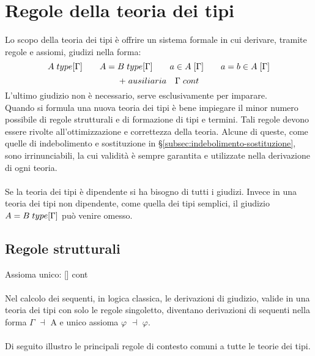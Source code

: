 \chapter{Regole della teoria dei tipi}
\label{cap:regole-teoria-dei-tipi}
Lo scopo della teoria dei tipi \`e offrire un sistema formale in cui derivare, tramite regole e assiomi, giudizi nella forma:
\[ A \hspace{0.1cm} type[\Gamma] \qquad
A = B \hspace{0.1cm} type[\Gamma] \qquad
a \in A\hspace{0.1cm} [\Gamma] \qquad
a=b \in A \hspace{0.1cm}[\Gamma]
\]
\[
+ \hspace{0.1cm} ausiliaria \quad \Gamma \hspace{0.1cm} cont
\]
L'ultimo giudizio non \`e necessario, serve esclusivamente per imparare.\\
Quando si formula una nuova teoria dei tipi \`e bene impiegare il minor numero possibile di regole strutturali e di formazione di tipi e termini. Tali regole devono essere rivolte all'ottimizzazione e correttezza della teoria. Alcune di queste, come quelle di indebolimento e sostituzione in \S\ref{subsec:indebolimento-sostituzione}, sono irrinunciabili, la cui validit\`a \`e sempre garantita e utilizzate nella derivazione di ogni teoria.\\\\
Se la teoria dei tipi \`e dipendente si ha bisogno di tutti i giudizi. Invece in una teoria dei tipi non dipendente, come quella dei tipi semplici, il giudizio $A = B \hspace{0.1cm} type[\Gamma]$ pu\`o venire omesso.\\

\section{Regole strutturali}
\label{sec:regole-strutturali}
Assioma unico: [\hspace{0.1cm}] cont\\\\
Nel calcolo dei sequenti, in logica classica, le derivazioni di giudizio, valide in una teoria dei tipi con solo le regole singoletto, diventano derivazioni di sequenti nella forma $\Gamma$ $\dashv$ A e unico assioma $\varphi$ $\dashv$ $\varphi$.
\\\\
Di seguito illustro le principali regole di contesto comuni a tutte le teorie dei tipi.
